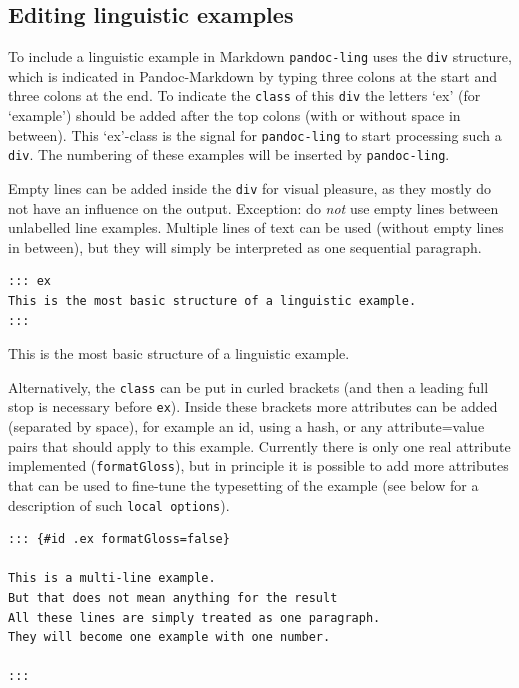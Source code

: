 \documentclass[
]{article}
\begin{document}
\hypertarget{editing-linguistic-examples}{%
\subsection{Editing linguistic
examples}\label{editing-linguistic-examples}}

To include a linguistic example in Markdown \texttt{pandoc-ling} uses
the \texttt{div} structure, which is indicated in Pandoc-Markdown by
typing three colons at the start and three colons at the end. To
indicate the \texttt{class} of this \texttt{div} the letters `ex' (for
`example') should be added after the top colons (with or without space
in between). This `ex'-class is the signal for \texttt{pandoc-ling} to
start processing such a \texttt{div}. The numbering of these examples
will be inserted by \texttt{pandoc-ling}.

Empty lines can be added inside the \texttt{div} for visual pleasure, as
they mostly do not have an influence on the output. Exception: do
\emph{not} use empty lines between unlabelled line examples. Multiple
lines of text can be used (without empty lines in between), but they
will simply be interpreted as one sequential paragraph.

\begin{verbatim}
::: ex
This is the most basic structure of a linguistic example. 
:::
\end{verbatim}

\begin{samepage}
  This is the most basic structure of a linguistic example.
\xe
\end{samepage}

Alternatively, the \texttt{class} can be put in curled brackets (and
then a leading full stop is necessary before \texttt{ex}). Inside these
brackets more attributes can be added (separated by space), for example
an id, using a hash, or any attribute=value pairs that should apply to
this example. Currently there is only one real attribute implemented
(\texttt{formatGloss}), but in principle it is possible to add more
attributes that can be used to fine-tune the typesetting of the example
(see below for a description of such \texttt{local\ options}).

\begin{verbatim}
::: {#id .ex formatGloss=false}

This is a multi-line example.
But that does not mean anything for the result
All these lines are simply treated as one paragraph.
They will become one example with one number.

:::
\end{verbatim}
\end{document}
